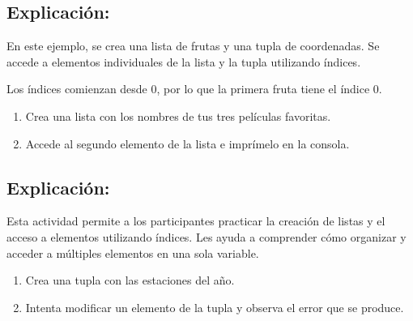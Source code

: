 \documentclass[
  a4paper,
  DIV=11,
  numbers=noendperiod,
  onepage,
  openany]{scrreprt}
\providecommand{\tightlist}{%
  \setlength{\itemsep}{0pt}\setlength{\parskip}{0pt}}\usepackage{longtable,booktabs,array}
\begin{document}
\subsection{Explicación:}\label{explicaciuxf3n-7}

En este ejemplo, se crea una lista de frutas y una tupla de coordenadas.
Se accede a elementos individuales de la lista y la tupla utilizando
índices.

Los índices comienzan desde 0, por lo que la primera fruta tiene el
índice 0.

\begin{tcolorbox}[enhanced jigsaw, toptitle=1mm, toprule=.15mm, title=\textcolor{quarto-callout-tip-color}{\faLightbulb}\hspace{0.5em}{Actividad Práctica (Listas):}, colbacktitle=quarto-callout-tip-color!10!white, opacitybacktitle=0.6, titlerule=0mm, colback=white, left=2mm, bottomrule=.15mm, breakable, bottomtitle=1mm, rightrule=.15mm, colframe=quarto-callout-tip-color-frame, arc=.35mm, leftrule=.75mm, coltitle=black, opacityback=0]

\begin{enumerate}
\def\labelenumi{\arabic{enumi}.}
\tightlist
\item
  Crea una lista con los nombres de tus tres películas favoritas.
\item
  Accede al segundo elemento de la lista e imprímelo en la consola.
\end{enumerate}

\end{tcolorbox}

\subsection{Explicación:}\label{explicaciuxf3n-8}

Esta actividad permite a los participantes practicar la creación de
listas y el acceso a elementos utilizando índices. Les ayuda a
comprender cómo organizar y acceder a múltiples elementos en una sola
variable.

\begin{tcolorbox}[enhanced jigsaw, toptitle=1mm, toprule=.15mm, title=\textcolor{quarto-callout-tip-color}{\faLightbulb}\hspace{0.5em}{Actividad Práctica (Tuplas):}, colbacktitle=quarto-callout-tip-color!10!white, opacitybacktitle=0.6, titlerule=0mm, colback=white, left=2mm, bottomrule=.15mm, breakable, bottomtitle=1mm, rightrule=.15mm, colframe=quarto-callout-tip-color-frame, arc=.35mm, leftrule=.75mm, coltitle=black, opacityback=0]

\begin{enumerate}
\def\labelenumi{\arabic{enumi}.}
\tightlist
\item
  Crea una tupla con las estaciones del año.
\item
  Intenta modificar un elemento de la tupla y observa el error que se
  produce.
\end{enumerate}

\end{tcolorbox}
\end{document}
